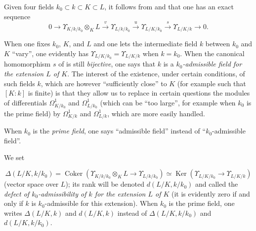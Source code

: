 \begin{env}[21.6.1]
\label{0.21.6.1}
Given four fields $k_0\subset k\subset K\subset L$, it follows from  and  that one has an exact sequence
\begin{equation}
\tag{21.6.1.1}
  \label{0.21.6.1.1}
  0\to\Upsilon_{K/k/k_0}\otimes_K L\xrightarrow{v}\Upsilon_{L/k/k_0}\xrightarrow{u}\Upsilon_{L/K/k_0}\xrightarrow{s}\Upsilon_{L/K/k}\to 0.
\end{equation}

When one fixes $k_0$, $K$, and $L$ and one lets the intermediate field $k$ between $k_0$ and $K$ ``vary'', one evidently has $\Upsilon_{L/K/k_0}=\Upsilon_{L/K/k}$ when $k=k_0$.
When the canonical homomorphism $s$ of  is still \emph{bijective}, one says that $k$ is a \emph{$k_0$-admissible field for the extension $L$ of $K$}.
The interest of the existence, under certain conditions, of such fields $k$, which are however ``sufficiently close'' to $K$ (for example such that $[K:k]$ is finite) is that they allow us to replace in certain questions the modules of differentials $\Omega^1_{K/k_0}$ and $\Omega^1_{L/k_0}$ (which can be ``too large'', for example when $k_0$ is the prime field) by $\Omega^1_{K/k}$ and $\Omega^1_{L/k}$, which are more easily handled.

When $k_0$ is the \emph{prime field}, one says ``admissible field'' instead of ``$k_0$-admissible field''.

We set
\end{env}

\begin{env}[21.6.1.2]
\label{0.21.6.1.2}
\[
  \Delta(L/K,k/k_0)=\operatorname{Coker}(\Upsilon_{K/k/k_0}\otimes_K L\to\Upsilon_{L/k/k_0})\simeq\operatorname{Ker}(\Upsilon_{L/K/k_0}\to\Upsilon_{L/K/k})
\]
(vector space over $L$); its rank will be denoted $d(L/K,k/k_0)$ and called the \emph{defect of $k_0$-admissibility of $k$ for the extension $L$ of $K$} (it is evidently zero if and only if $k$ is $k_0$-admissible for this extension).
When $k_0$ is the prime field, one writes $\Delta(L/K,k)$ and $d(L/K,k)$ instead of $\Delta(L/K,k/k_0)$ and $d(L/K,k/k_0)$.
\end{env}

